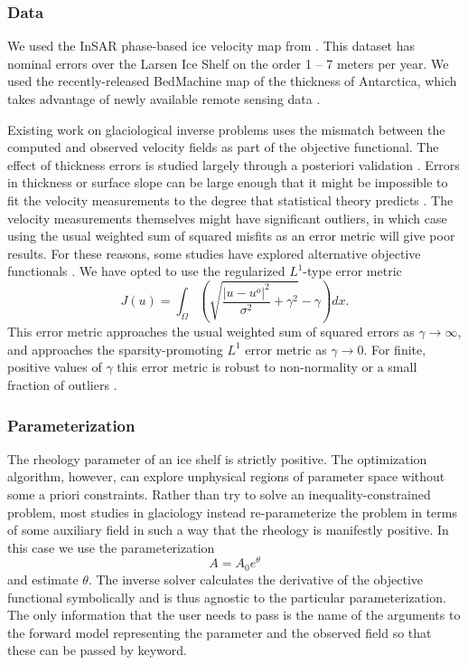 \documentclass[journal abbreviation, manuscript]{copernicus}
\begin{document}
\subsubsection{Data}

We used the InSAR phase-based ice velocity map from \citet{mouginot2019continent}.
This dataset has nominal errors over the Larsen Ice Shelf on the order 1 -- 7 meters per year.
We used the recently-released BedMachine map of the thickness of Antarctica, which takes advantage of newly available remote sensing data \citep{morlighem2019deep}.

Existing work on glaciological inverse problems uses the mismatch between the computed and observed velocity fields as part of the objective functional.
The effect of thickness errors is studied largely through a posteriori validation \citep{joughin2004basal, larour2005rheology}.
Errors in thickness or surface slope can be large enough that it might be impossible to fit the velocity measurements to the degree that statistical theory predicts \citep{macayeal1995basal}.
The velocity measurements themselves might have significant outliers, in which case using the usual weighted sum of squared misfits as an error metric will give poor results.
For these reasons, some studies have explored alternative objective functionals \citep{morlighem2010spatial}.
We have opted to use the regularized $L^1$-type error metric
\begin{equation}
    J(u) = \int_\Omega\left(\sqrt{\frac{|u - u^o|^2}{\sigma^2} + \gamma^2} - \gamma\right)dx.
    \label{eq:l1-error-metric}
\end{equation}
This error metric approaches the usual weighted sum of squared errors as $\gamma \to \infty$, and approaches the sparsity-promoting $L^1$ error metric as $\gamma \to 0$.
For finite, positive values of $\gamma$ this error metric is robust to non-normality or a small fraction of outliers \citep{barron2019general}.


\subsubsection{Parameterization}

The rheology parameter of an ice shelf is strictly positive.
The optimization algorithm, however, can explore unphysical regions of parameter space without some a priori constraints.
Rather than try to solve an inequality-constrained problem, most studies in glaciology instead re-parameterize the problem in terms of some auxiliary field in such a way that the rheology is manifestly positive.
In this case we use the parameterization
\begin{equation}
    A = A_0e^{\theta}
\end{equation}
and estimate $\theta$.
The inverse solver calculates the derivative of the objective functional symbolically and is thus agnostic to the particular parameterization.
The only information that the user needs to pass is the name of the arguments to the forward model representing the parameter and the observed field so that these can be passed by keyword.
\end{document}
